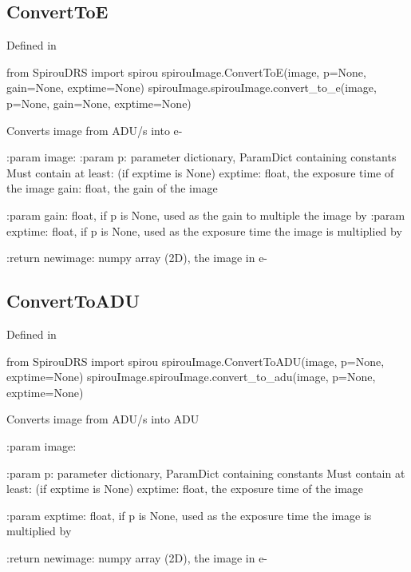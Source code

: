\begin{minipage}{\textwidth}
\subsection{ConvertToE}

Defined in \spirouImage{}

\begin{pythonbox}
from SpirouDRS import spirou
spirouImage.ConvertToE(image, p=None, gain=None, exptime=None)
spirouImage.spirouImage.convert_to_e(image, p=None, gain=None, exptime=None)
\end{pythonbox}

\begin{pythondocstring}
Converts image from ADU/s into e-

:param image:
:param p: parameter dictionary, ParamDict containing constants
        Must contain at least: (if exptime is None)
            exptime: float, the exposure time of the image
            gain: float, the gain of the image

:param gain: float, if p is None, used as the gain to multiple the image by
:param exptime: float, if p is None, used as the exposure time the image
                is multiplied by

:return newimage: numpy array (2D), the image in e-
\end{pythondocstring}
\end{minipage}

\begin{minipage}{\textwidth}
\subsection{ConvertToADU}

Defined in \spirouImage{}

\begin{pythonbox}
from SpirouDRS import spirou
spirouImage.ConvertToADU(image, p=None, exptime=None)
spirouImage.spirouImage.convert_to_adu(image, p=None, exptime=None)
\end{pythonbox}

\begin{pythondocstring}
Converts image from ADU/s into ADU

:param image:

:param p: parameter dictionary, ParamDict containing constants
    Must contain at least: (if exptime is None)
        exptime: float, the exposure time of the image

:param exptime: float, if p is None, used as the exposure time the image
                is multiplied by

:return newimage: numpy array (2D), the image in e-
\end{pythondocstring}
\end{minipage}


